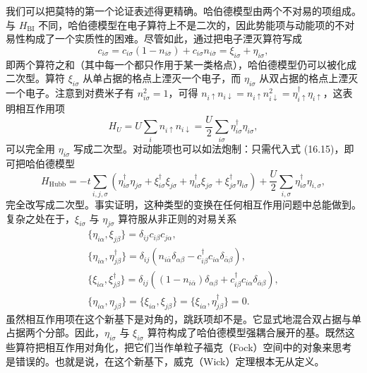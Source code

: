 我们可以把莫特的第一个论证表述得更精确。哈伯德模型由两个不对易的项组成。与 $H_{\mathrm{BI}}$ 不同，哈伯德模型在电子算符上不是二次的，因此势能项与动能项的不对易性构成了一个实质性的困难。尽管如此，通过把电子湮灭算符写成
\begin{equation*}
c_{i\sigma}=c_{i\sigma}(1-n_{i\bar{\sigma}})+c_{i\sigma}n_{i\bar{\sigma}}=\xi_{i\sigma}+\eta_{i\sigma},\tag{16.15}
\end{equation*}
即两个算符之和（其中每一个都只作用于某一类格点），哈伯德模型仍可以被化成二次型。算符 $\xi_{i\sigma}$ 从单占据的格点上湮灭一个电子，而 $\eta_{i\sigma}$ 从双占据的格点上湮灭一个电子。注意到对费米子有 $n^{2}_{i\sigma}=1$，可得 $n_{i\uparrow}n_{i\downarrow}=n_{i\uparrow}n^{2}_{i\downarrow}=\eta^{\dagger}_{i\uparrow}\eta_{i\uparrow}$，这表明相互作用项
\begin{equation*}
H_{U}=U\sum_{i}n_{i\uparrow}n_{i\downarrow}=\frac{U}{2}\sum_{i\sigma}\eta^{\dagger}_{i\sigma}\eta_{i\sigma},\tag{16.16}
\end{equation*}
可以完全用 $\eta_{i\sigma}$ 写成二次型。对动能项也可以如法炮制：只需代入式 (16.15)，即可把哈伯德模型
\begin{equation*}
H_{\mathrm{Hubb}}=-t\sum_{i,j,\sigma}\left(\eta^{\dagger}_{i\sigma}\eta_{j\sigma}+\xi^{\dagger}_{i\sigma}\xi_{j\sigma}+\eta^{\dagger}_{i\sigma}\xi_{j\sigma}+\xi^{\dagger}_{j\sigma}\eta_{i\sigma}\right)+\frac{U}{2}\sum_{i,\sigma}\eta^{\dagger}_{i\sigma}\eta_{i,\sigma},\tag{16.17}
\end{equation*}
完全改写成二次型。事实证明，这种类型的变换在任何相互作用问题中总能做到。复杂之处在于，$\xi_{i\sigma}$ 与 $\eta_{j\sigma}$ 算符服从非正则的对易关系
\begin{align*}
\{\eta_{i\alpha},\xi_{j\beta}\}=\delta_{ij}c_{i\beta}c_{j\alpha},\\
\{\eta_{i\alpha},\eta^{\dagger}_{j\beta}\}=\delta_{ij}(n_{i\bar{\alpha}}\delta_{\alpha\beta}-c^{\dagger}_{i\beta}c_{i\alpha}\delta_{\bar{\alpha}\beta}),\\
\{\xi_{i\alpha},\xi^{\dagger}_{j\beta}\}=\delta_{ij}((1-n_{i\bar{\alpha}})\delta_{\alpha\beta}+c^{\dagger}_{i\beta}c_{i\alpha}\delta_{\bar{\alpha}\beta}),\\
\{\eta_{i\alpha},\eta_{j\beta}\}=\{\xi_{i\alpha},\xi_{j\beta}\}=\{\xi_{i\alpha},\eta^{\dagger}_{j\beta}\}=0.\tag{16.18}
\end{align*}
虽然相互作用项在这个新基下是对角的，跳跃项却不是。它显式地混合双占据与单占据两个分部。因此，$\eta_{i\sigma}$ 与 $\xi_{i\sigma}$ 算符构成了哈伯德模型强耦合展开的基。既然这些算符把相互作用对角化，把它们当作单粒子福克（Fock）空间中的对象来思考是错误的。也就是说，在这个新基下，威克（Wick）定理根本无从定义。

